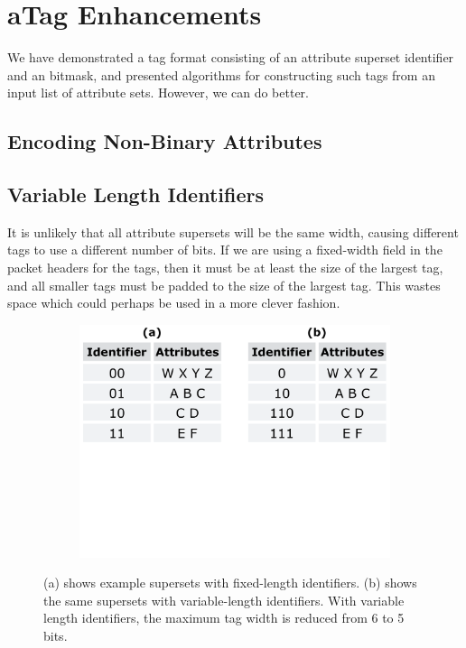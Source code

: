 \section{aTag Enhancements}
We have demonstrated a tag format consisting of an attribute superset identifier and an bitmask, and presented algorithms for constructing such tags from an input list of attribute sets. However, we can do better.

\subsection{Encoding Non-Binary Attributes}



\subsection{Variable Length Identifiers}
It is unlikely that all attribute supersets will be the same width, causing different tags to use a different number of bits. If we are using a fixed-width field in the packet headers for the tags, then it must be at least the size of the largest tag, and all smaller tags must be padded to the size of the largest tag. This wastes space which could perhaps be used in a more clever fashion.

\begin{figure}[t!] 
\begin{minipage}{1\linewidth}
\begin{subfigure}[c]{0.96\linewidth}
\includegraphics[trim={0 10cm 0 0}, clip, width=\linewidth]{figures/variable_identifiers}
\end{subfigure} 
\end{minipage} 
\caption{(a) shows example supersets with fixed-length identifiers. (b) shows the same supersets with variable-length identifiers. With variable length identifiers, the maximum tag width is reduced from 6 to 5 bits. }
\label{fig:variable_id}
\end{figure}

